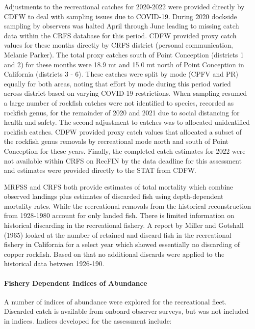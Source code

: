 \documentclass[11pt,
  english,
  letterpaper,
]{article}
\begin{document}
Adjustments to the recreational catches for 2020-2022 were provided directly by CDFW to deal with sampling issues due to COVID-19. During 2020 dockside sampling by observers was halted April through June leading to missing catch data within the CRFS database for this period. CDFW provided proxy catch values for these months directly by CRFS district (personal communication, Melanie Parker). The total proxy catches south of Point Conception (districts 1 and 2) for these months were 18.9 mt and 15.0 mt north of Point Conception in California (districts 3 - 6). These catches were split by mode (CPFV and PR) equally for both areas, noting that effort by mode during this period varied across district based on varying COVID-19 restrictions. When sampling resumed a large number of rockfish catches were not identified to species, recorded as rockfish genus, for the remainder of 2020 and 2021 due to social distancing for health and safety. The second adjustment to catches was to allocated unidentified rockfish catches. CDFW provided proxy catch values that allocated a subset of the rockfish genus removals by recreational mode north and south of Point Conception for these years. Finally, the completed catch estimates for 2022 were not available within CRFS on RecFIN by the data deadline for this assessment and estimates were provided directly to the STAT from CDFW.

MRFSS and CRFS both provide estimates of total mortality which combine observed landings plus estimates of discarded fish using depth-dependent mortality rates. While the recreational removals from the historical reconstruction from 1928-1980 account for only landed fish. There is limited information on historical discarding in the recreational fishery. A report by Miller and Gotshall (1965) looked at the number of retained and discard fish in the recreational fishery in California for a select year which showed essentially no discarding of copper rockfish. Based on that no additional discards were applied to the historical data between 1926-190.

\hypertarget{fishery-dependent-indices-of-abundance}{%
\paragraph{Fishery Dependent Indices of Abundance}\label{fishery-dependent-indices-of-abundance}}

\hfill\break

A number of indices of abundance were explored for the recreational fleet. Discarded catch is available from onboard observer surveys, but was not included in indices. Indices developed for the assessment include:
\end{document}
